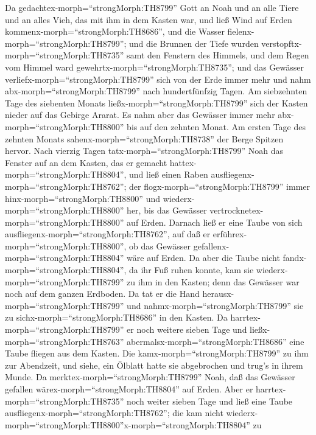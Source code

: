  Da gedachtex-morph=``strongMorph:TH8799'' Gott an Noah und
an alle Tiere und an alles Vieh, das mit ihm in dem Kasten war, und ließ
Wind auf Erden kommenx-morph=``strongMorph:TH8686'', und die Wasser
fielenx-morph=``strongMorph:TH8799'';  und die Brunnen der
Tiefe wurden verstopftx-morph=``strongMorph:TH8735'' samt den Fenstern
des Himmels, und dem Regen vom Himmel ward
gewehrtx-morph=``strongMorph:TH8735'';  und das Gewässer
verliefx-morph=``strongMorph:TH8799'' sich von der Erde immer mehr und
nahm abx-morph=``strongMorph:TH8799'' nach hundertfünfzig Tagen.
 Am siebzehnten Tage des siebenten Monats
ließx-morph=``strongMorph:TH8799'' sich der Kasten nieder auf das
Gebirge Ararat.  Es nahm aber das Gewässer immer mehr
abx-morph=``strongMorph:TH8800'' bis auf den zehnten Monat. Am ersten
Tage des zehnten Monats sahenx-morph=``strongMorph:TH8738'' der Berge
Spitzen hervor.  Nach vierzig Tagen
tatx-morph=``strongMorph:TH8799'' Noah das Fenster auf an dem Kasten,
das er gemacht hattex-morph=``strongMorph:TH8804'',  und
ließ einen Raben ausfliegenx-morph=``strongMorph:TH8762''; der
flogx-morph=``strongMorph:TH8799'' immer
hinx-morph=``strongMorph:TH8800'' und
wiederx-morph=``strongMorph:TH8800'' her, bis das Gewässer
vertrocknetex-morph=``strongMorph:TH8800'' auf Erden. 
Darnach ließ er eine Taube von sich
ausfliegenx-morph=``strongMorph:TH8762'', auf daß er
erführex-morph=``strongMorph:TH8800'', ob das Gewässer
gefallenx-morph=``strongMorph:TH8804'' wäre auf Erden.  Da
aber die Taube nicht fandx-morph=``strongMorph:TH8804'', da ihr Fuß
ruhen konnte, kam sie wiederx-morph=``strongMorph:TH8799'' zu ihm in den
Kasten; denn das Gewässer war noch auf dem ganzen Erdboden. Da tat er
die Hand herausx-morph=``strongMorph:TH8799'' und
nahmx-morph=``strongMorph:TH8799'' sie zu
sichx-morph=``strongMorph:TH8686'' in den Kasten.  Da
harrtex-morph=``strongMorph:TH8799'' er noch weitere sieben Tage und
ließx-morph=``strongMorph:TH8763''
abermalsx-morph=``strongMorph:TH8686'' eine Taube fliegen aus dem
Kasten.  Die kamx-morph=``strongMorph:TH8799'' zu ihm zur
Abendzeit, und siehe, ein Ölblatt hatte sie abgebrochen und trug's in
ihrem Munde. Da merktex-morph=``strongMorph:TH8799'' Noah, daß das
Gewässer gefallen wärex-morph=``strongMorph:TH8804'' auf Erden.
 Aber er harrtex-morph=``strongMorph:TH8735'' noch weiter
sieben Tage und ließ eine Taube
ausfliegenx-morph=``strongMorph:TH8762''; die kam nicht
wiederx-morph=``strongMorph:TH8800''x-morph=``strongMorph:TH8804'' zu
